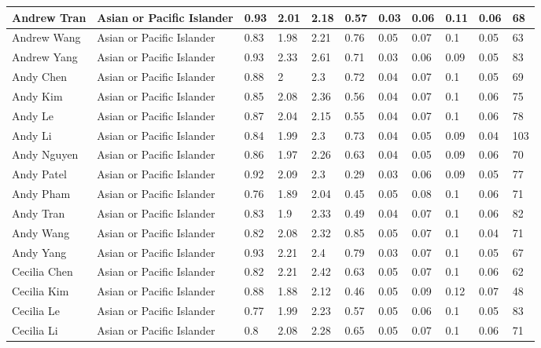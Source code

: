 \begin{table}[!ht]
\begin{tabular}{|l|l|l|l|l|l|l|l|l|l|l|}
        Andrew Tran & Asian or Pacific Islander & 0.93 & 2.01 & 2.18 & 0.57 & 0.03 & 0.06 & 0.11 & 0.06 & 68 \\ \hline
        Andrew Wang & Asian or Pacific Islander & 0.83 & 1.98 & 2.21 & 0.76 & 0.05 & 0.07 & 0.1 & 0.05 & 63 \\ \hline
        Andrew Yang & Asian or Pacific Islander & 0.93 & 2.33 & 2.61 & 0.71 & 0.03 & 0.06 & 0.09 & 0.05 & 83 \\ \hline
        Andy Chen & Asian or Pacific Islander & 0.88 & 2 & 2.3 & 0.72 & 0.04 & 0.07 & 0.1 & 0.05 & 69 \\ \hline
        Andy Kim & Asian or Pacific Islander & 0.85 & 2.08 & 2.36 & 0.56 & 0.04 & 0.07 & 0.1 & 0.06 & 75 \\ \hline
        Andy Le & Asian or Pacific Islander & 0.87 & 2.04 & 2.15 & 0.55 & 0.04 & 0.07 & 0.1 & 0.06 & 78 \\ \hline
        Andy Li & Asian or Pacific Islander & 0.84 & 1.99 & 2.3 & 0.73 & 0.04 & 0.05 & 0.09 & 0.04 & 103 \\ \hline
        Andy Nguyen & Asian or Pacific Islander & 0.86 & 1.97 & 2.26 & 0.63 & 0.04 & 0.05 & 0.09 & 0.06 & 70 \\ \hline
        Andy Patel & Asian or Pacific Islander & 0.92 & 2.09 & 2.3 & 0.29 & 0.03 & 0.06 & 0.09 & 0.05 & 77 \\ \hline
        Andy Pham & Asian or Pacific Islander & 0.76 & 1.89 & 2.04 & 0.45 & 0.05 & 0.08 & 0.1 & 0.06 & 71 \\ \hline
        Andy Tran & Asian or Pacific Islander & 0.83 & 1.9 & 2.33 & 0.49 & 0.04 & 0.07 & 0.1 & 0.06 & 82 \\ \hline
        Andy Wang & Asian or Pacific Islander & 0.82 & 2.08 & 2.32 & 0.85 & 0.05 & 0.07 & 0.1 & 0.04 & 71 \\ \hline
        Andy Yang & Asian or Pacific Islander & 0.93 & 2.21 & 2.4 & 0.79 & 0.03 & 0.07 & 0.1 & 0.05 & 67 \\ \hline
        Cecilia Chen & Asian or Pacific Islander & 0.82 & 2.21 & 2.42 & 0.63 & 0.05 & 0.07 & 0.1 & 0.06 & 62 \\ \hline
        Cecilia Kim & Asian or Pacific Islander & 0.88 & 1.88 & 2.12 & 0.46 & 0.05 & 0.09 & 0.12 & 0.07 & 48 \\ \hline
        Cecilia Le & Asian or Pacific Islander & 0.77 & 1.99 & 2.23 & 0.57 & 0.05 & 0.06 & 0.1 & 0.05 & 83 \\ \hline
        Cecilia Li & Asian or Pacific Islander & 0.8 & 2.08 & 2.28 & 0.65 & 0.05 & 0.07 & 0.1 & 0.06 & 71 \\ \hline

\end{tabular}
\end{table}

